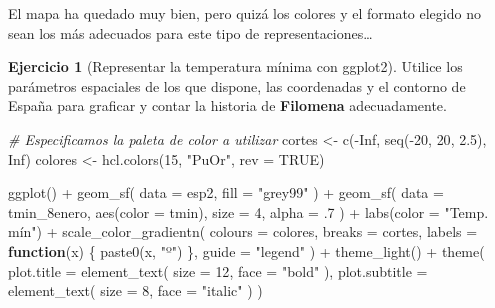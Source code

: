 \documentclass[
]{book}
\newenvironment{Shaded}{\begin{snugshade}}{\end{snugshade}}
\newcommand{\AttributeTok}[1]{\textcolor[rgb]{0.77,0.63,0.00}{#1}}
\newcommand{\CommentTok}[1]{\textcolor[rgb]{0.56,0.35,0.01}{\textit{#1}}}
\newcommand{\ConstantTok}[1]{\textcolor[rgb]{0.00,0.00,0.00}{#1}}
\newcommand{\ControlFlowTok}[1]{\textcolor[rgb]{0.13,0.29,0.53}{\textbf{#1}}}
\newcommand{\DecValTok}[1]{\textcolor[rgb]{0.00,0.00,0.81}{#1}}
\newcommand{\FloatTok}[1]{\textcolor[rgb]{0.00,0.00,0.81}{#1}}
\newcommand{\FunctionTok}[1]{\textcolor[rgb]{0.00,0.00,0.00}{#1}}
\newcommand{\NormalTok}[1]{#1}
\newcommand{\OtherTok}[1]{\textcolor[rgb]{0.56,0.35,0.01}{#1}}
\newcommand{\SpecialCharTok}[1]{\textcolor[rgb]{0.00,0.00,0.00}{#1}}
\newcommand{\StringTok}[1]{\textcolor[rgb]{0.31,0.60,0.02}{#1}}
\theoremstyle{definition}
\theoremstyle{definition}
\theoremstyle{definition}
\newtheorem{exercise}{Ejercicio}[chapter]
\theoremstyle{definition}
\theoremstyle{remark}
\begin{document}
El mapa ha quedado muy bien, pero quizá los colores y el formato elegido no sean
los más adecuados para este tipo de representaciones\ldots{}

\begin{exercise}[Representar la temperatura mínima con ggplot2]
Utilice los parámetros espaciales de los que dispone, las coordenadas y el
contorno de España para graficar y contar la historia de \textbf{Filomena}
adecuadamente.
\end{exercise}

\begin{Shaded}
\begin{Highlighting}[]

\CommentTok{\# Especificamos la paleta de color a utilizar}
\NormalTok{cortes }\OtherTok{\textless{}{-}} \FunctionTok{c}\NormalTok{(}\SpecialCharTok{{-}}\ConstantTok{Inf}\NormalTok{, }\FunctionTok{seq}\NormalTok{(}\SpecialCharTok{{-}}\DecValTok{20}\NormalTok{, }\DecValTok{20}\NormalTok{, }\FloatTok{2.5}\NormalTok{), }\ConstantTok{Inf}\NormalTok{)}
\NormalTok{colores }\OtherTok{\textless{}{-}} \FunctionTok{hcl.colors}\NormalTok{(}\DecValTok{15}\NormalTok{, }\StringTok{"PuOr"}\NormalTok{, }\AttributeTok{rev =} \ConstantTok{TRUE}\NormalTok{)}


\FunctionTok{ggplot}\NormalTok{() }\SpecialCharTok{+}
  \FunctionTok{geom\_sf}\NormalTok{(}
    \AttributeTok{data =}\NormalTok{ esp2,}
    \AttributeTok{fill =} \StringTok{"grey99"}
\NormalTok{  ) }\SpecialCharTok{+}
  \FunctionTok{geom\_sf}\NormalTok{(}
    \AttributeTok{data =}\NormalTok{ tmin\_8enero,}
    \FunctionTok{aes}\NormalTok{(}\AttributeTok{color =}\NormalTok{ tmin),}
    \AttributeTok{size =} \DecValTok{4}\NormalTok{,}
    \AttributeTok{alpha =}\NormalTok{ .}\DecValTok{7}
\NormalTok{  ) }\SpecialCharTok{+}
  \FunctionTok{labs}\NormalTok{(}\AttributeTok{color =} \StringTok{"Temp. mín"}\NormalTok{) }\SpecialCharTok{+}
  \FunctionTok{scale\_color\_gradientn}\NormalTok{(}
    \AttributeTok{colours =}\NormalTok{ colores,}
    \AttributeTok{breaks =}\NormalTok{ cortes,}
    \AttributeTok{labels =} \ControlFlowTok{function}\NormalTok{(x) \{}
      \FunctionTok{paste0}\NormalTok{(x, }\StringTok{"º"}\NormalTok{)}
\NormalTok{    \},}
    \AttributeTok{guide =} \StringTok{"legend"}
\NormalTok{  ) }\SpecialCharTok{+}
  \FunctionTok{theme\_light}\NormalTok{() }\SpecialCharTok{+}
  \FunctionTok{theme}\NormalTok{(}
    \AttributeTok{plot.title =} \FunctionTok{element\_text}\NormalTok{(}
      \AttributeTok{size =} \DecValTok{12}\NormalTok{,}
      \AttributeTok{face =} \StringTok{"bold"}
\NormalTok{    ),}
    \AttributeTok{plot.subtitle =} \FunctionTok{element\_text}\NormalTok{(}
      \AttributeTok{size =} \DecValTok{8}\NormalTok{,}
      \AttributeTok{face =} \StringTok{"italic"}
\NormalTok{    )}
\NormalTok{  )}
\end{Highlighting}
\end{Shaded}
\end{document}
